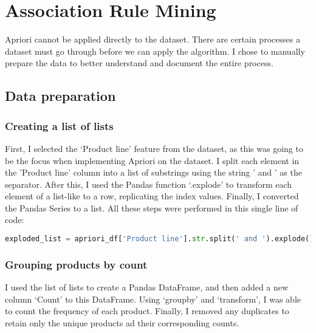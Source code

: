 
\chapter{Association Rule Mining} %

\label{Chapter4} %

Apriori cannot be applied directly to the dataset. There are certain processes a dataset must go through before we can apply the algorithm. I chose to manually prepare the data to better understand and document the entire process.

\section{Data preparation }

\subsection{Creating a list of lists}
First, I selected the ‘Product line’ feature from the dataset, as this was going to be the focus when implementing Apriori on the dataset. I split each element in the 'Product line' column into a list of substrings using the string ' and ' as the separator. After this, I used the Pandas function ‘.explode’ to transform each element of a list-like to a row, replicating the index values. Finally, I converted the Pandas Series to a list. All these steps were performed in this single line of code:
\begin{lstlisting}[language=Python, frame=none]
exploded_list = apriori_df['Product line'].str.split(' and ').explode().tolist()
\end{lstlisting}

\subsection{Grouping products by count}
I used the list of lists to create a Pandas DataFrame, and then added a new column ‘Count’ to this DataFrame. Using ‘groupby’ and ‘transform’, I was able to count the frequency of each product. Finally, I removed any duplicates to retain only the unique products ad their corresponding counts.

